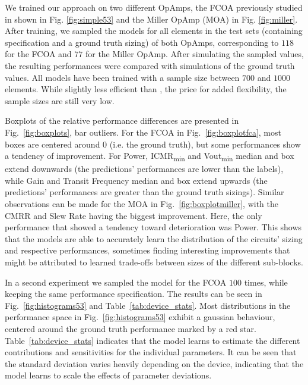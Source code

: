 \documentclass[conference]{IEEEtran}
\begin{document}
	We trained our approach on two different OpAmps, the FCOA previously studied in \cite{leibl24inverse} shown in Fig. \ref{fig:simple53} and the Miller OpAmp (MOA) in Fig. \ref{fig:miller}. %
	After training, we sampled the models for all elements in the test sets (containing specification and a ground truth sizing) of both OpAmps, corresponding to $118$ for the FCOA and $77$ for the Miller OpAmp. 
	After simulating the sampled values, the resulting performances were compared with simulations of the ground truth values. 
	All models have been trained with a sample size between $700$ and $1000$ elements. While slightly less efficient than \cite{leibl24inverse}, the price for added flexibility, the sample sizes are still very low.
	
	Boxplots of the relative performance differences are presented in Fig.~\ref{fig:boxplots}, bar outliers.
	For the FCOA in Fig.~\ref{fig:boxplotfca}, most boxes are centered around $0$ (i.e. the ground truth), but some performances show a tendency of improvement. For Power, ICMR\textsubscript{min} and Vout\textsubscript{min} median and box extend downwards (the predictions' performances are lower than the labels), while Gain and Transit Frequency median and box extend upwards (the predictions' performances are greater than the ground truth sizings). Similar observations can be made for the MOA in Fig.~\ref{fig:boxplotmiller}, with the CMRR and Slew Rate having the biggest improvement. Here, the only performance that showed a tendency toward deterioration was Power. This shows that the models are able to accurately learn the distribution of the circuits' sizing and respective performances, sometimes finding interesting improvements that might be attributed to learned trade-offs between sizes of the different sub-blocks.
	
	In a second experiment we sampled the model for the FCOA $100$ times, while keeping the same performance specification. The results can be seen in Fig.~\ref{fig:histograms53} and Table~\ref{tab:device_stats}. Most distributions in the performance space in Fig.~\ref{fig:histograms53} exhibit a gaussian behaviour, centered around the ground truth performance marked by a red star. Table~\ref{tab:device_stats} indicates that the model learns to estimate the different contributions and sensitivities for the individual parameters. It can be seen that the standard deviation varies heavily depending on the device, indicating that the model learns to scale the effects of parameter deviations.
\end{document}
